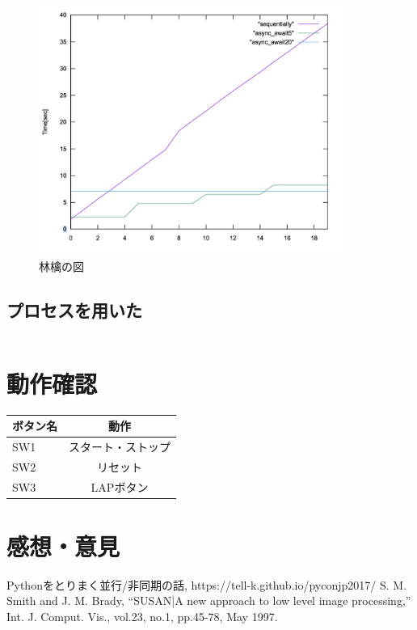 \documentclass[14pt, oneside]{article}     	%
\begin{document}
\begin{figure}[h]
  \centering
  \includegraphics[width=10cm]{time.png}
  \caption{林檎の図}
\end{figure}

\subsection{プロセスを用いた}


\begin{lstlisting}[caption=シンプレクス法プログラム]

\end{lstlisting}


\section{動作確認}

\vspace{5mm}


\begin{center}
  \begin{table}[htb]
    \begin{tabular}{|l|c|} \hline
      ボタン名 & 動作 \\ \hline \hline
      SW1 & スタート・ストップ \\ \hline
      SW2 & リセット \\ \hline
      SW3 & LAPボタン \\ \hline
    \end{tabular}
  \end{table}
\end{center}


\vspace{5mm}





\section{感想・意見}

\begin{thebibliography}{9}
   Pythonをとりまく並行/非同期の話,  https://tell-k.github.io/pyconjp2017/
   S. M. Smith and J. M. Brady,
    ``SUSAN|A new approach to low level image processing,'' Int. J. Comput.
    Vis., vol.23, no.1, pp.45-78, May 1997.
\end{thebibliography}
\end{document}
